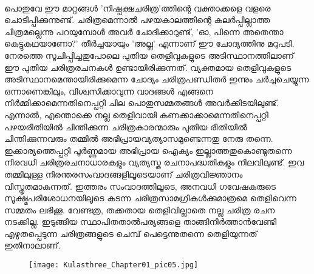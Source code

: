 	\paragraph{}	പൊതുവേ ഈ മാറ്റങ്ങൾ 'നിഷ്പക്ഷചരിത്ര'ത്തിന്റെ വക്താക്കളെ വളരെ ചൊടിപ്പിക്കുന്നുണ്ട്. ചരിത്രമെന്നാൽ പഴയകാലത്തിന്റെ കലർപ്പില്ലാത്ത ചിത്രമല്ലെന്നു പറയുമ്പോൾ അവർ ചോദിക്കാറുണ്ട്, 'ഓ, പിന്നെ അതെന്താ കെട്ടുകഥയാണോ?' തീർച്ചയായും 'അല്ല' എന്നാണ് ഈ ചോദ്യത്തിനു മറുപടി. നേരത്തെ സൂചിപ്പിച്ചതുപോലെ പുതിയ തെളിവുകളുടെ അടിസ്ഥാനത്തിലാണ് ഈ പുതിയ ചരിത്രരചനകൾ ഉണ്ടായിരിക്കുന്നത്. വ്യക്തമായ തെളിവുകളുടെ അടിസ്ഥാനമെന്തായിരിക്കുമെന്ന ചോദ്യം ചരിത്രപണ്ഡിതർ ഇന്നും ചർച്ചചെയ്യുന്ന ഒന്നാണെങ്കിലും, വിശ്വസിക്കാവുന്ന വാദങ്ങൾ എങ്ങനെ നിർമ്മിക്കാമെന്നതിനെപ്പറ്റി ചില പൊതുസമ്മതങ്ങൾ അവർക്കിടയിലുണ്ട്. എന്നാൽ, എന്തൊക്കെ നല്ല തെളിവായി കണക്കാക്കാമെന്നതിനെപ്പറ്റി പഴയരീതിയിൽ ചിന്തിക്കുന്ന ചരിത്രകാരന്മാരും പുതിയ രീതിയിൽ ചിന്തിക്കുന്നവരും തമ്മിൽ അഭിപ്രായവ്യത്യാസമുണ്ടെന്നതു നേരു തന്നെ. ഇക്കാര്യത്തെപ്പറ്റി പൂർണ്ണമായ അഭിപ്രായ ഐക്യം ഇല്ലാത്തതുകൊണ്ടുതന്നെ നിരവധി ചരിത്രരചനാധാരകളും വ്യത്യസ്ത രചനാപദ്ധതികളും നിലവിലുണ്ട്. ഇവ തമ്മിലുള്ള നിരന്തരസംവാദങ്ങളിലൂടെയാണ് ചരിത്രവിജ്ഞാനം വിസ്തൃതമാകുന്നത്. ഇത്തരം സംവാദത്തിലൂടെ, അനവധി ഗവേഷകരുടെ സൂക്ഷ്മപരിശോധനയിലൂടെ കടന്ന ചരിത്രസാമഗ്രികൾക്കുമാത്രമെ തെളിവെന്ന സമ്മതം ലഭിക്കൂ. വേണ്ടത്ര, തക്കതായ തെളിവില്ലാതെ നല്ല ചരിത്ര രചന നടക്കില്ല. ഇടുങ്ങിയ സ്ഥാപിതതാൽപര്യങ്ങളെ താങ്ങിനിർത്താൻവേണ്ടി എഴുതപ്പെടുന്ന ചരിത്രങ്ങളുടെ ചെമ്പ് പെട്ടെന്നുതന്നെ തെളിയുന്നത് ഇതിനാലാണ്.

\begin{figure}[h]
\begin{center}
\texttt{[image: Kulasthree\_Chapter01\_pic05.jpg]}
\end{center}
\end{figure}



